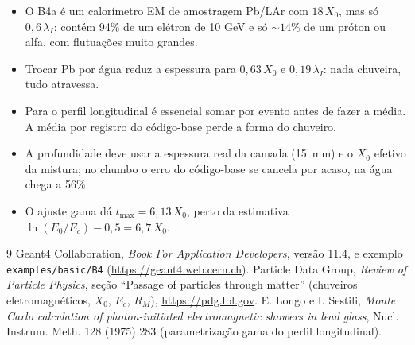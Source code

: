 \documentclass[a4paper,11pt]{article}
\begin{document}
\begin{itemize}
  \item O B4a é um calorímetro EM de amostragem Pb/LAr com $18\,X_0$, mas só $0{,}6\,\lambda_I$: contém 94\% de um
    elétron de 10 GeV e só $\sim 14\%$ de um próton ou alfa, com flutuações muito grandes.
  \item Trocar Pb por água reduz a espessura para $0{,}63\,X_0$ e $0{,}19\,\lambda_I$: nada chuveira, tudo atravessa.
  \item Para o perfil longitudinal é essencial somar por evento antes de fazer a média. A média por registro do código-base
    perde a forma do chuveiro.
  \item A profundidade deve usar a espessura real da camada (15~mm) e o $X_0$ efetivo da mistura; no chumbo o erro
    do código-base se cancela por acaso, na água chega a 56\%.
  \item O ajuste gama dá $t_\text{max} = 6{,}13\,X_0$, perto da estimativa $\ln(E_0/E_c) - 0{,}5 = 6{,}7\,X_0$.
\end{itemize}

\begin{thebibliography}{9}
 Geant4 Collaboration, \emph{Book For Application Developers}, versão 11.4, e exemplo
  \texttt{examples/basic/B4} (\url{https://geant4.web.cern.ch}).
 Particle Data Group, \emph{Review of Particle Physics}, seção ``Passage of particles through matter''
  (chuveiros eletromagnéticos, $X_0$, $E_c$, $R_M$), \url{https://pdg.lbl.gov}.
 E. Longo e I. Sestili, \emph{Monte Carlo calculation of photon-initiated electromagnetic showers in lead
  glass}, Nucl. Instrum. Meth. 128 (1975) 283 (parametrização gama do perfil longitudinal).
\end{thebibliography}
\end{document}
